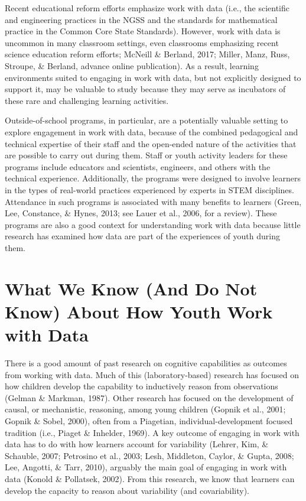 \documentclass[]{msu-thesis}
\theoremstyle{definition}
\theoremstyle{definition}
\theoremstyle{definition}
\theoremstyle{remark}
\begin{document}
Recent educational reform efforts emphasize work with data (i.e., the
scientific and engineering practices in the NGSS and the standards for
mathematical practice in the Common Core State Standards). However, work
with data is uncommon in many classroom settings, even classrooms
emphasizing recent science education reform efforts; McNeill \& Berland,
2017; Miller, Manz, Russ, Stroupe, \& Berland, advance online
publication). As a result, learning environments suited to engaging in
work with data, but not explicitly designed to support it, may be
valuable to study because they may serve as incubators of these rare and
challenging learning activities.

Outside-of-school programs, in particular, are a potentially valuable
setting to explore engagement in work with data, because of the combined
pedagogical and technical expertise of their staff and the open-ended
nature of the activities that are possible to carry out during them.
Staff or youth activity leaders for these programs include educators and
scientists, engineers, and others with the technical experience.
Additionally, the programs were designed to involve learners in the
types of real-world practices experienced by experts in STEM
disciplines. Attendance in such programs is associated with many
benefits to learners (Green, Lee, Constance, \& Hynes, 2013; see Lauer
et al., 2006, for a review). These programs are also a good context for
understanding work with data because little research has examined how
data are part of the experiences of youth during them.

\section{What We Know (And Do Not Know) About How Youth Work with
Data}\label{what-we-know-and-do-not-know-about-how-youth-work-with-data}

There is a good amount of past research on cognitive capabilities as
outcomes from working with data. Much of this (laboratory-based)
research has focused on how children develop the capability to
inductively reason from observations (Gelman \& Markman, 1987). Other
research has focused on the development of causal, or mechanistic,
reasoning, among young children (Gopnik et al., 2001; Gopnik \& Sobel,
2000), often from a Piagetian, individual-development focused tradition
(i.e., Piaget \& Inhelder, 1969). A key outcome of engaging in work with
data has to do with how learners account for variability (Lehrer, Kim,
\& Schauble, 2007; Petrosino et al., 2003; Lesh, Middleton, Caylor, \&
Gupta, 2008; Lee, Angotti, \& Tarr, 2010), arguably the main goal of
engaging in work with data (Konold \& Pollatsek, 2002). From this
research, we know that learners can develop the capacity to reason about
variability (and covariability).
\end{document}
